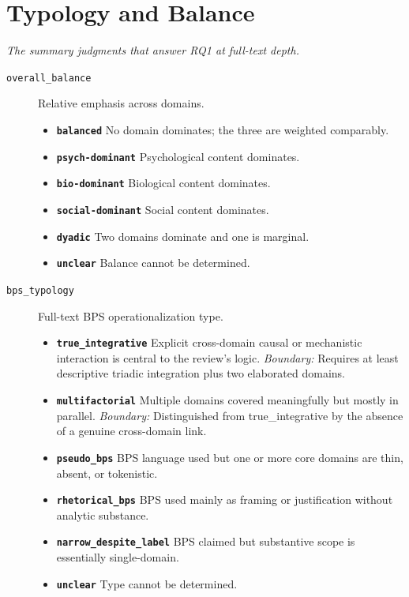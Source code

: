 \documentclass[11pt]{article}
\begin{document}
\section*{Typology and Balance}
{\small\itshape The summary judgments that answer RQ1 at full-text depth.}\par\smallskip
\begin{description}
\item[\texttt{overall\_balance}] Relative emphasis across domains.
  \begin{itemize}[leftmargin=1.3em,itemsep=2pt,topsep=2pt]
  \item \textbf{\texttt{balanced}} No domain dominates; the three are weighted comparably.
  \item \textbf{\texttt{psych-dominant}} Psychological content dominates.
  \item \textbf{\texttt{bio-dominant}} Biological content dominates.
  \item \textbf{\texttt{social-dominant}} Social content dominates.
  \item \textbf{\texttt{dyadic}} Two domains dominate and one is marginal.
  \item \textbf{\texttt{unclear}} Balance cannot be determined.
  \end{itemize}
\item[\texttt{bps\_typology}] Full-text BPS operationalization type.
  \begin{itemize}[leftmargin=1.3em,itemsep=2pt,topsep=2pt]
  \item \textbf{\texttt{true\_integrative}} Explicit cross-domain causal or mechanistic interaction is central to the review's logic. {\small \textit{Boundary:} Requires at least descriptive triadic integration plus two elaborated domains.}
  \item \textbf{\texttt{multifactorial}} Multiple domains covered meaningfully but mostly in parallel. {\small \textit{Boundary:} Distinguished from true\_integrative by the absence of a genuine cross-domain link.}
  \item \textbf{\texttt{pseudo\_bps}} BPS language used but one or more core domains are thin, absent, or tokenistic.
  \item \textbf{\texttt{rhetorical\_bps}} BPS used mainly as framing or justification without analytic substance.
  \item \textbf{\texttt{narrow\_despite\_label}} BPS claimed but substantive scope is essentially single-domain.
  \item \textbf{\texttt{unclear}} Type cannot be determined.
  \end{itemize}
\end{description}
\end{document}
